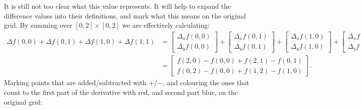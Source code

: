 \documentclass{article}
\theoremstyle{definition}
\begin{document}
It is still not too clear what this value represents. It will help to expand the difference values into their definitions, and mark what this means on the original grid. By summing over $[0,2]\times[0,2]$ we are effectively calculating:
\begin{align*}
	\Delta f(0,0)+\Delta f(0,1)+\Delta f(1,0)+\Delta f(1,1)&=
	\begin{bmatrix}\Delta_x f(0,0)\\\Delta_y f(0,0)\end{bmatrix}+\begin{bmatrix}\Delta_x f(0,1)\\\Delta_y f(0,1)\end{bmatrix}+\begin{bmatrix}\Delta_x f(1,0)\\\Delta_y f(1,0)\end{bmatrix}+\begin{bmatrix}\Delta_x f(1,1)\\\Delta_y f(1,1)\end{bmatrix}\\&=\begin{bmatrix}f(2,0)-f(0,0)+f(2,1)-f(0,1)\\f(0,2)-f(0,0)+f(1,2)-f(1,0)\end{bmatrix}.
\end{align*}
Marking points that are added/subtracted with $+$/$-$, and colouring the ones that count to the first part of the derivative with red, and second part blue, on the original grid:
\end{document}
